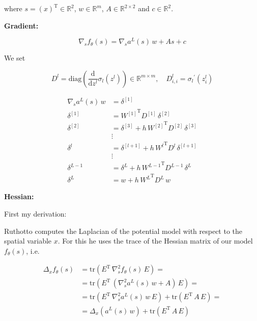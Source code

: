 where $s = \left(x\right)^{\mathrm{T}} \in \mathbb{R}^{2}$, $w \in \mathbb{R}^{m}$, $A \in \mathbb{R}^{2 \times 2}$ and $c \in \mathbb{R}^2$.

\textbf{Gradient:}

\begin{equation*}
    \nabla_s f_{\theta}\left(s\right) = \nabla_s a^{L}\left(s\right) \, w + A s + c
\end{equation*}

We set

\begin{equation*}
    D^{l} = \mathrm{diag} \left( \frac{\mathrm{d}}{\mathrm{d}z^{l}} \sigma_{l} \left(z^{l}\right) \right) \in \mathbb{R}^{m \times m}, \quad D_{i, i}^{l} = {\sigma_{l}}^{\prime} \left(z_{i}^{l}\right)
\end{equation*}

\begin{align*}
    \nabla_s a^{L}\left(s\right) \, w & = \delta^{[1]}  \\
    \delta^{[1]} & = {W^{[1]}}^{\mathrm{T}} D^{[1]} \, \delta^{[2]} \\
    \delta^{[2]} & = \delta^{[3]} + h \, {W^{[2]}}^{\mathrm{T}} D^{[2]} \, \delta^{[3]} \\
    &\vdots\\
    \delta^{l} & = \delta^{[l+1]} + h \, {W^{l}}^{\mathrm{T}} D^{l} \, \delta^{[l+1]} \\
    &\vdots\\
    \delta^{L-1} & = \delta^{L} + h \, {W^{L-1}}^{\mathrm{T}} D^{L-1} \, \delta^{L} \\
    \delta^{L} & = w + h \, {W^{L}}^{\mathrm{T}} D^{L} \, w
\end{align*}


\textbf{Hessian:}

First my derivation:

Ruthotto computes the Laplacian of the potential model with respect to the spatial variable $x$. For this he uses the trace of the Hessian matrix of our model $f_{\theta}\left(s\right)$, i.e. 

\begin{align*}
    \Delta_x f_{\theta}\left(s\right) & = \mathrm{tr}\left(E^{\mathrm{T}} \, \nabla^{2}_s f_{\theta}\left(s\right) \, E\right) = \\
    & = \mathrm{tr}\left(E^{\mathrm{T}} \, \left(\nabla^{2}_s a^{L}\left(s\right) \, w + A\right) \, E\right) = \\
    & = \mathrm{tr}\left(E^{\mathrm{T}} \, \nabla^{2}_s a^{L}\left(s\right) \, w \, E\right) + \mathrm{tr}\left(E^{\mathrm{T}} \,  A \, E\right) = \\
    & = \Delta_x \left(a^{L}\left(s\right) \, w\right) + \mathrm{tr}\left(E^{\mathrm{T}} \,  A \, E\right)
\end{align*}

